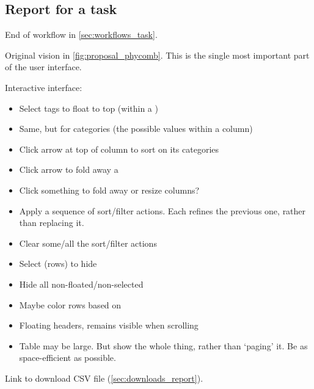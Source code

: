 \subsection{Report for a task}
\label{sec:views_report_task}

End of workflow in \cref{sec:workflows_task}.

Original vision in \cref{fig:proposal_phycomb}.
This is the single most important part of the user interface.

Interactive interface:
\begin{itemize}
    \item Select tags to float \Elements to top (within a \Refset)
    \item Same, but for categories (\ie the possible values within a column)
    \item Click arrow at top of column to sort on its categories
    \item Click arrow to fold away a \Refset %
    \item Click something to fold away or resize columns? %
    \item Apply a sequence of sort/filter actions.  Each refines the previous one, rather than replacing it. %
    \item Clear some/all the sort/filter actions
    \item Select \Elements (rows) to hide
    \item Hide all non-floated/non-selected \Elements
    \item Maybe color rows based on \Performance
    \item Floating headers, remains visible when scrolling
    \item Table may be large.  But show the whole thing, rather than `paging' it.  Be as space-efficient as possible.
\end{itemize}


Link to download CSV file (\cref{sec:downloads_report}).

